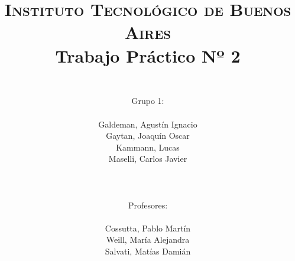 



    \title{
        \normalfont \normalsize \textsc{Instituto Tecnol\'ogico de Buenos Aires} \\ [25pt]
        \huge Trabajo Pr\'actico Nº 2 \\
        \author{
            \\Grupo 1:\\\\Galdeman, Agust\'in Ignacio\\Gaytan, Joaqu\'in Oscar\\Kammann, Lucas\\Maselli, Carlos Javier\\ \\ \\ \\
            Profesores: \\\\ Cossutta, Pablo Mart\'in\\Weill, Mar\'ia Alejandra\\Salvati, Mat\'ias Dami\'an \\ \\ \\ 
        } 
    }

    \maketitle
    \newpage

    \tableofcontents

    \newpage
    
    \newpage
    
    \newpage
    
    \newpage
    
